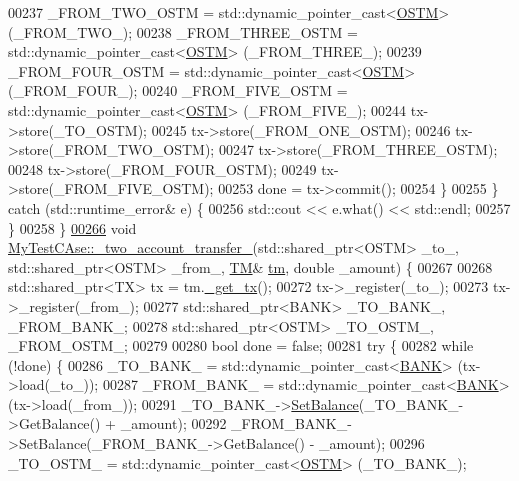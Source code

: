 \begin{DoxyCode}
00237             \_FROM\_TWO\_OSTM = std::dynamic\_pointer\_cast<\hyperlink{class_o_s_t_m}{OSTM}> (\_FROM\_TWO\_);
00238             \_FROM\_THREE\_OSTM = std::dynamic\_pointer\_cast<\hyperlink{class_o_s_t_m}{OSTM}> (\_FROM\_THREE\_);
00239             \_FROM\_FOUR\_OSTM = std::dynamic\_pointer\_cast<\hyperlink{class_o_s_t_m}{OSTM}> (\_FROM\_FOUR\_);
00240             \_FROM\_FIVE\_OSTM = std::dynamic\_pointer\_cast<\hyperlink{class_o_s_t_m}{OSTM}> (\_FROM\_FIVE\_);
00244             tx->store(\_TO\_OSTM);
00245             tx->store(\_FROM\_ONE\_OSTM);
00246             tx->store(\_FROM\_TWO\_OSTM);
00247             tx->store(\_FROM\_THREE\_OSTM);
00248             tx->store(\_FROM\_FOUR\_OSTM);
00249             tx->store(\_FROM\_FIVE\_OSTM);
00253             done = tx->commit();
00254         \}
00255     \} \textcolor{keywordflow}{catch} (std::runtime\_error& e) \{
00256         std::cout << e.what() << std::endl;
00257     \}
00258 \}
\hypertarget{_my_test_c_ase_8cpp_source.tex_l00266}{}\hyperlink{class_my_test_c_ase_af0cc86421d281cc4a583a394ae86dbdd_af0cc86421d281cc4a583a394ae86dbdd}{00266}  \textcolor{keywordtype}{void} \hyperlink{class_my_test_c_ase_af0cc86421d281cc4a583a394ae86dbdd_af0cc86421d281cc4a583a394ae86dbdd}{MyTestCAse::\_two\_account\_transfer\_}(std::shared\_ptr<OSTM> \_to\_, 
      std::shared\_ptr<OSTM> \_from\_, \hyperlink{class_t_m}{TM}& \hyperlink{class_my_test_c_ase_a422e6e5d4ddedea384be96031c89b72b_a422e6e5d4ddedea384be96031c89b72b}{tm}, \textcolor{keywordtype}{double} \_amount) \{
00267 
00268     std::shared\_ptr<TX> tx = tm.\hyperlink{class_t_m_a41cb0226cc4080c931651b13f74a0075_a41cb0226cc4080c931651b13f74a0075}{\_get\_tx}();
00272     tx->\_register(\_to\_);
00273     tx->\_register(\_from\_);
00277     std::shared\_ptr<BANK> \_TO\_BANK\_, \_FROM\_BANK\_;
00278     std::shared\_ptr<OSTM> \_TO\_OSTM\_, \_FROM\_OSTM\_;
00279 
00280     \textcolor{keywordtype}{bool} done = \textcolor{keyword}{false};
00281     \textcolor{keywordflow}{try} \{
00282         \textcolor{keywordflow}{while} (!done) \{
00286             \_TO\_BANK\_ = std::dynamic\_pointer\_cast<\hyperlink{class_b_a_n_k}{BANK}> (tx->load(\_to\_));
00287             \_FROM\_BANK\_ = std::dynamic\_pointer\_cast<\hyperlink{class_b_a_n_k}{BANK}> (tx->load(\_from\_));
00291             \_TO\_BANK\_->\hyperlink{class_b_a_n_k_ae3e45b407bf8ec7175662442ea24b7c0_ae3e45b407bf8ec7175662442ea24b7c0}{SetBalance}(\_TO\_BANK\_->GetBalance() + \_amount);
00292             \_FROM\_BANK\_->SetBalance(\_FROM\_BANK\_->GetBalance() - \_amount);
00296             \_TO\_OSTM\_ = std::dynamic\_pointer\_cast<\hyperlink{class_o_s_t_m}{OSTM}> (\_TO\_BANK\_);

\end{DoxyCode}

